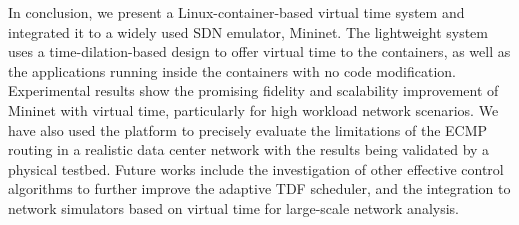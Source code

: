 \label{VT:Sec:Conclusion}

In conclusion, we present a Linux-container-based virtual time system and integrated it to a widely used SDN emulator, Mininet.
The lightweight system uses a time-dilation-based design to offer virtual time to the containers,
as well as the applications running inside the containers with no code modification.
Experimental results show the promising fidelity and scalability improvement of Mininet with virtual time,
particularly for high workload network scenarios. We have also used the platform to precisely
evaluate the limitations of the ECMP routing in a realistic data center network with the results being validated by a physical testbed.
Future works include the investigation of other effective control algorithms to further improve the adaptive TDF scheduler,
and the integration to network simulators based on virtual time for large-scale network analysis.

